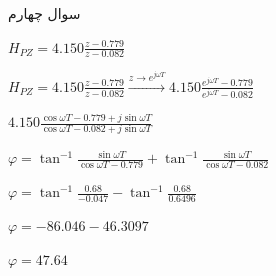 \documentclass[12pt]{article}
\begin{document}
    
    \begin{problem}{سوال چهارم}
    	\raggedleft
    	
    	${{H}_{PZ}}=4.150\frac{z-0.779}{z-0.082}$
    	
    	$
    		{{H}_{PZ}}=4.150\frac{z-0.779}{z-0.082}\xrightarrow{z\to {{e}^{j\omega T}}}4.150\frac{{{e}^{j\omega T}}-0.779}{{{e}^{j\omega T}}-0.082}
    	$
    	
    	$
    		4.150\frac{\cos \omega T-0.779+j\sin \omega T}{\cos \omega T-0.082+j\sin \omega T}
    	$
    	
    	$
    		\varphi ={{\tan }^{-1}}\frac{\sin \omega T}{\cos \omega T-0.779}+{{\tan }^{-1}}\frac{\sin \omega T}{\cos \omega T-0.082} 
    	$
    	
    	$
    		\varphi ={{\tan }^{-1}}\frac{0.68}{-0.047}-{{\tan }^{-1}}\frac{0.68}{0.6496}
    	$
    	
    	$
    		\varphi =-86.046-46.3097
    	$
    	
    	$
    		\varphi =47.64
    	$
    \end{problem}
    
\end{document}
